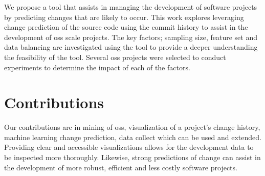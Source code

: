

We propose a tool that assists in managing the development of software projects by predicting changes that are likely to occur. This work explores leveraging change prediction of the source code using the commit history to assist in the development of \gls{oss} scale projects. The key factors; sampling size, feature set and data balancing are investigated using the tool to provide a deeper understanding the feasibility of the tool. Several \gls{oss} projects were selected to conduct experiments to determine the impact of each of the factors.

\section{Contributions}


Our contributions are in mining of \gls{oss}, visualization of a project's change history, machine learning change prediction, data collect which can be used and extended. Providing clear and accessible visualizations allows for the development data to be inspected more thoroughly. Likewise, strong predictions of change can assist in the development of more robust, efficient and less costly software projects.

